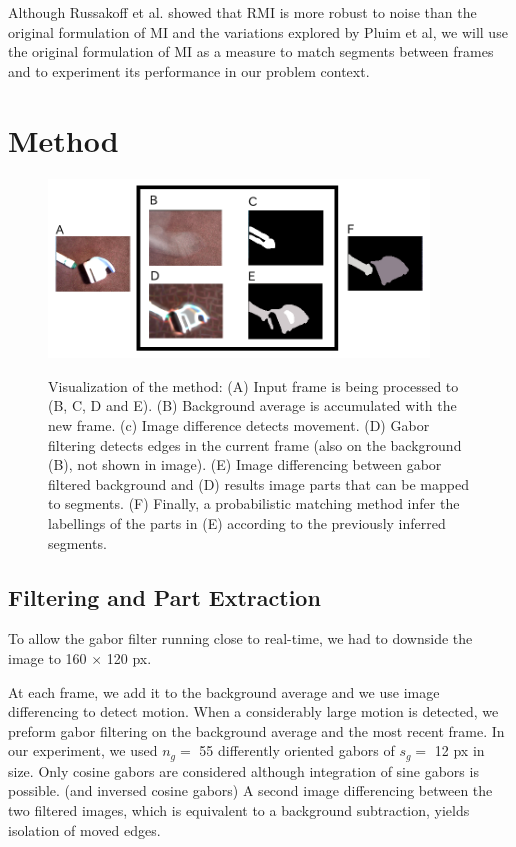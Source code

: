 \documentclass{article}
\begin{document}
Although Russakoff et al. showed that RMI is more robust to noise than the original formulation of MI and the variations explored by Pluim et al, we will use the original formulation of MI as a measure to match segments between frames and to experiment its performance in our problem context. 

\section{Method}


\begin{figure}[tbp]
\begin{center}
\caption{Visualization of the method: (A) Input frame is being processed to (B, C, D and E). (B) Background average is accumulated with the new frame. (c) Image difference detects movement. (D) Gabor filtering detects edges in the current frame (also on the background (B), not shown in image). (E) Image differencing between gabor filtered background and (D) results image parts that can be mapped to segments. (F) Finally, a probabilistic matching method infer the labellings of the parts in (E) according to the previously inferred segments.}
  \includegraphics[width=0.9\textwidth]{1}
\label{figure:model_seq}
\end{center}
\end{figure}


\subsection{Filtering and Part Extraction}

To allow the gabor filter running close to real-time, we had to downside the image to 160 $\times$ 120 px. 

At each frame, we add it to the background average and we use image differencing to detect motion. When a considerably large motion is detected, we preform gabor filtering on the background average and the most recent frame. In our experiment, we used $n_g=$ 55 differently oriented gabors of $s_g=$ 12 px in size. Only cosine gabors are considered although integration of sine gabors is possible. (and inversed cosine gabors) A second image differencing between the two filtered images, which is equivalent to a background subtraction, yields isolation of moved edges. 
\end{document}
